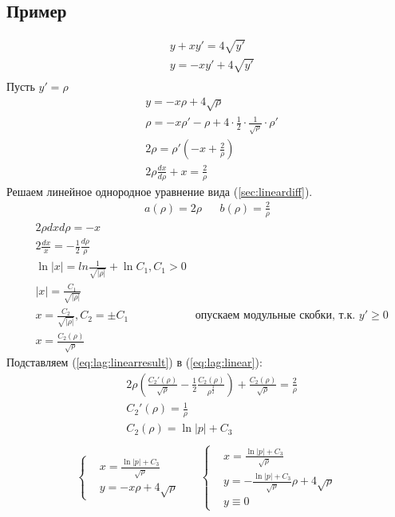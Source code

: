 \documentclass[fontsize=10pt,a4paper,fleqn]{scrreprt} %
\numberwithin{equation}{section}
\begin{document}
\subsection{Пример}
\begin{align*}
&  y + xy' = 4\sqrt{y'}\\
& y = -xy' + 4\sqrt{y'}\\
\end{align*}
Пусть $y' = \rho$
\begin{align}
&  y = -x\rho+4\sqrt{\rho}\nonumber\\
& \rho = -x\rho' - \rho +4\cdot\frac12\cdot\frac1{\sqrt{\rho}}\cdot\rho'\nonumber\\
& 2\rho = \rho'(-x + \frac2{\rho})\nonumber\\
& 2\rho\frac{dx}{d\rho} + x = \frac2{\rho}\label{eq:lag:linear}
\end{align}
Решаем линейное однородное уравнение вида (\ref{sec:lineardiff}).
\begin{align*}
  a(\rho) = 2\rho && b(\rho) = \frac2{\rho}
\end{align*}
\begin{align}
&  2\rho{dx}{d\rho} = -x\nonumber\\
&  2\frac{dx}x = -\frac12\frac{d\rho}\rho\nonumber\\
&\ln |x| = ln\frac1{\sqrt{|\rho|}} + \ln C_1, C_1 > 0\nonumber \\
&|x| = \frac{C_1}{\sqrt{|\rho|}}\nonumber\\
&x = \frac{C_2}{\sqrt{|\rho|}}, C_2 = \pm C_1\nonumber & \text{опускаем модульные скобки, т.к. } y' \geq 0\\
&x = \frac{C_2(\rho)}{\sqrt{\rho}}\label{eq:lag:linearresult}
\end{align}
Подставляем (\ref{eq:lag:linearresult}) в (\ref{eq:lag:linear}):
\begin{align}
&  2\rho\left(\frac{C_2'(\rho)}{\sqrt{\rho}} - \frac12 \frac{C_2(\rho)}{\rho^{\frac32}}\right) + \frac{C_2(\rho)}{\sqrt{\rho}} = \frac2{\rho}\nonumber\\
&C_2'(\rho) = \frac1\rho\nonumber\\
&C_2(\rho) = \ln |p| + C_3\nonumber\\
\end{align}
\begin{align*}
  \begin{cases}
  &  x = \frac{\ln|p| + C_3}{\sqrt{\rho}}\\
  &  y = -x\rho + 4\sqrt{\rho}
  \end{cases} &&
  \begin{cases}
  &  x = \frac{\ln|p| + C_3}{\sqrt{\rho}}\\
  &  y = -\frac{\ln|p| + C_3}{\sqrt{\rho}}\rho + 4\sqrt{\rho}\\
  &  y \equiv 0
  \end{cases}
\end{align*}
\end{document}
